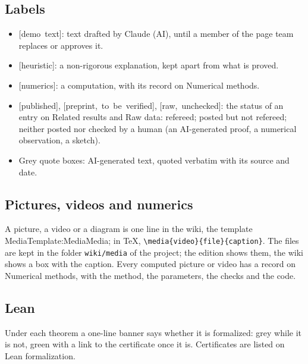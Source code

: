 \documentclass[11pt]{article}
\makeatletter
\theoremstyle{definition}
\theoremstyle{remark}
\newcommand{\ed@label}[1]{\mbox{\footnotesize[#1]}}
\newcommand{\demo}[1]{\ed@label{demo text}}
\newcommand{\heuristic}[1]{\ed@label{heuristic}}
\newcommand{\numerics}[1]{\ed@label{numerics}}
\newcommand{\published}[1]{\ed@label{published}}
\newcommand{\preprint}[1]{\ed@label{preprint, to be verified}}
\newcommand{\raw}[1]{\ed@label{raw, unchecked}}
\newcommand{\wikilink}[2]{\ifx\relax#2\relax#1\else#2\fi}
\newcommand{\nowikicode}[1]{\texttt{\frenchspacing#1}}
\makeatother
\begin{document}
\subsection{Labels}
\begin{itemize}
  \item \demo{}: text drafted by Claude (AI), until a member of the page team replaces or approves it.
  \item \heuristic{}: a non-rigorous explanation, kept apart from what is proved.
  \item \numerics{}: a computation, with its record on \wikilink{Numerical methods}{}.
  \item \published{}, \preprint{}, \raw{}: the status of an entry on \wikilink{Related results}{} and \wikilink{Raw data}{}: refereed; posted but not refereed; neither posted nor checked by a human (an AI-generated proof, a numerical observation, a sketch).
  \item Grey quote boxes: AI-generated text, quoted verbatim with its source and date.
\end{itemize}

\subsection{Pictures, videos and numerics}
A picture, a video or a diagram is one line in the wiki, the template \wikilink{Template:Media}{Media}; in TeX, \nowikicode{\textbackslash{}media\{video\}\allowbreak{}\{file\}\allowbreak{}\{caption\}}. The files are kept in the folder \texttt{wiki/media} of the project; the edition shows them, the wiki shows a box with the caption. Every computed picture or video has a record on \wikilink{Numerical methods}{}, with the method, the parameters, the checks and the code.

\subsection{Lean}
Under each theorem a one-line banner says whether it is formalized: grey while it is not, green with a link to the certificate once it is. Certificates are listed on \wikilink{Lean formalization}{}.
\end{document}
